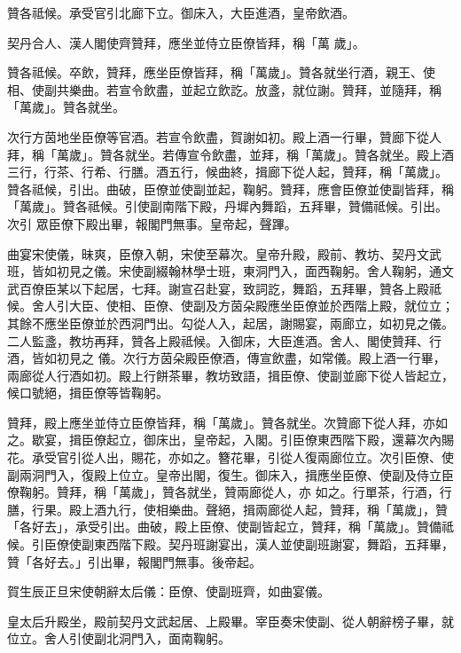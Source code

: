 \begin{pinyinscope}
 贊各祗候。承受官引北廊下立。御床入，大臣進酒，皇帝飲酒。



 契丹合人、漢人閣使齊贊拜，應坐並侍立臣僚皆拜，稱「萬
 歲」。



 贊各祗候。卒飲，贊拜，應坐臣僚皆拜，稱「萬歲」。贊各就坐行酒，親王、使相、使副共樂曲。若宣令飲盡，並起立飲訖。放盞，就位謝。贊拜，並隨拜，稱「萬歲」。贊各就坐。



 次行方茵地坐臣僚等官酒。若宣令飲盡，賀謝如初。殿上酒一行畢，贊廊下從人拜，稱「萬歲」。贊各就坐。若傳宣令飲盡，並拜，稱「萬歲」。贊各就坐。殿上酒三行，行茶、行希、行膳。酒五行，候曲終，揖廊下從人起，贊拜，稱「萬歲」。贊各祗候，引出。曲破，臣僚並使副並起，鞠躬。贊拜，應會臣僚並使副皆拜，稱「萬歲」。贊各祗候。引使副南階下殿，丹墀內舞蹈，五拜畢，贊備祗候。引出。次引
 眾臣僚下殿出畢，報閣門無事。皇帝起，聲蹕。



 曲宴宋使儀，昧爽，臣僚入朝，宋使至幕次。皇帝升殿，殿前、教坊、契丹文武班，皆如初見之儀。宋使副綴翰林學士班，東洞門入，面西鞠躬。舍人鞠躬，通文武百僚臣某以下起居，七拜。謝宣召赴宴，致詞訖，舞蹈，五拜畢，贊各上殿祗候。舍人引大臣、使相、臣僚、使副及方茵朵殿應坐臣僚並於西階上殿，就位立；其餘不應坐臣僚並於西洞門出。勾從人入，起居，謝賜宴，兩廊立，如初見之儀。二人監盞，教坊再拜，贊各上殿祗候。入御床，大臣進酒。舍人、閣使贊拜、行酒，皆如初見之
 儀。次行方茵朵殿臣僚酒，傳宣飲盡，如常儀。殿上酒一行畢，兩廊從人行酒如初。殿上行餅茶畢，教坊致語，揖臣僚、使副並廊下從人皆起立，候口號絕，揖臣僚等皆鞠躬。



 贊拜，殿上應坐並侍立臣僚皆拜，稱「萬歲」。贊各就坐。次贊廊下從人拜，亦如之。歇宴，揖臣僚起立，御床出，皇帝起，入閣。引臣僚東西階下殿，還幕次內賜花。承受官引從人出，賜花，亦如之。簪花畢，引從人復兩廊位立。次引臣僚、使副兩洞門入，復殿上位立。皇帝出閣，復生。御床入，揖應坐臣僚、使副及侍立臣僚鞠躬。贊拜，稱「萬歲」，贊各就坐，贊兩廊從人，亦
 如之。行單茶，行酒，行膳，行果。殿上酒九行，使相樂曲。聲絕，揖兩廊從人起，贊拜，稱「萬歲」，贊「各好去」，承受引出。曲破，殿上臣僚、使副皆起立，贊拜，稱「萬歲」。贊備祗候。引臣僚使副東西階下殿。契丹班謝宴出，漢人並使副班謝宴，舞蹈，五拜畢，贊「各好去。」引出畢，報閣門無事。後帝起。



 賀生辰正旦宋使朝辭太后儀：臣僚、使副班齊，如曲宴儀。



 皇太后升殿坐，殿前契丹文武起居、上殿畢。宰臣奏宋使副、從人朝辭榜子畢，就位立。舍人引使副北洞門入，面南鞠躬。




\end{pinyinscope}
